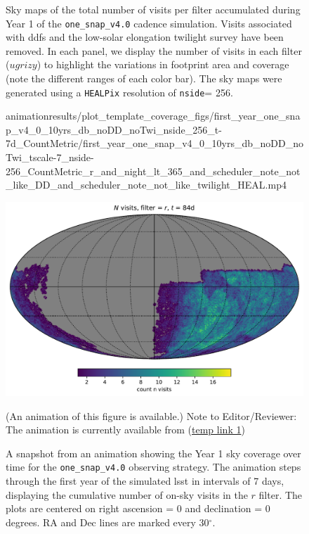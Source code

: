 \documentclass[preprintm,linenumbers]{aastex631}
\newcommand{\baseline}{\texttt{one\_snap\_v4.0}\xspace}
\newcommand{\nside}{\texttt{nside}\xspace}
\newcommand{\healpix}{\texttt{HEALPix}\xspace} %
\begin{document}
\begin{figure}
\begin{tabular}{@{}c@{}c@{}}
		\end{tabular}
		\caption{ Sky maps of the total number of visits per filter accumulated during Year 1 of the \baseline cadence simulation. 
  Visits associated with \glspl*{ddf} and the low-solar elongation twilight survey have been removed.  
  In each panel, we display the number of visits in each filter ($ugrizy$) to highlight the variations in footprint area and coverage (note the different ranges of each color bar).  
  The sky maps were generated using a \healpix resolution of \nside = 256.  
		}
		\label{fig:baseline_skymaps}
	\end{figure}

 		
		\begin{figure}
			\begin{center}
				\begin{interactive}{animation}{results/plot_template_coverage_figs/first_year_one_snap_v4_0_10yrs_db_noDD_noTwi_nside_256_t-7d_CountMetric/first_year_one_snap_v4_0_10yrs_db_noDD_noTwi_tscale-7_nside-256_CountMetric_r_and_night_lt_365_and_scheduler_note_not_like_DD_and_scheduler_note_not_like_twilight_HEAL.mp4}
				\end{interactive}
				\includegraphics[width=0.5\columnwidth]{results/first_year_one_snap_v4_0_10yrs_db_noDD_noTwi_tscale-7_nside-256_CountMetric_r_and_night_lt_84_and_scheduler_note_not_like_DD_and_scheduler_note_not_like_twilight_HEAL.pdf}
				\caption{A snapshot from an animation showing the Year 1 sky coverage over time for the \baseline observing strategy. 
    The animation steps through the first year of the simulated \gls*{lsst} in intervals of 7 days, displaying the cumulative number of on-sky visits in the $r$ filter. 
    The plots are centered on right ascension = 0 and declination = 0 degrees. RA and Dec lines are marked every 30$^\circ$.} (An animation of this figure is available.)  Note to Editor/Reviewer: The animation is currently available from (\href{https://cuillin.roe.ac.uk/~jrobinson/LSST-Incremental-Templates-Analysis-Paper_4_0/first_year_one_snap_v4_0_10yrs_db_noDD_noTwi_tscale-7_nside-256_CountMetric_r_and_night_lt_365_and_scheduler_note_not_like_DD_and_scheduler_note_not_like_twilight_HEAL.mp4}{temp link 1}) \label{animation:baseline}
			\end{center}
		\end{figure}
	
\end{document}
